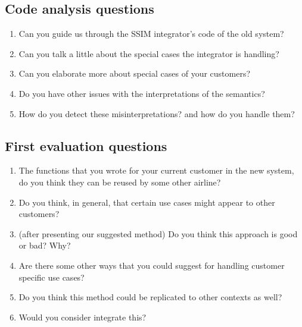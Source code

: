 \subsection*{Code analysis questions} 

\begin{enumerate}
\item Can you guide us through the SSIM integrator's code of the old system?
\item Can you talk a little about the special cases the integrator is handling?
\item Can you elaborate more about special cases of your customers?
\item Do you have other issues with the interpretations of the semantics?
\item How do you detect these misinterpretations? and how do you handle them?

  \end{enumerate}

\subsection*{First evaluation questions}



\begin{enumerate}
\item The functions that you wrote for your current customer in the new system, do you think they can be reused by some other airline?

\item Do you think, in general, that certain use cases might appear to other customers?

\item (after presenting our suggested method) Do you think this approach is good or bad? Why? 

\item Are there some other ways that you could suggest for handling customer specific use cases?

\item Do you think this method could be replicated to other contexts as well?

\item Would you consider integrate this?

  \end{enumerate}

